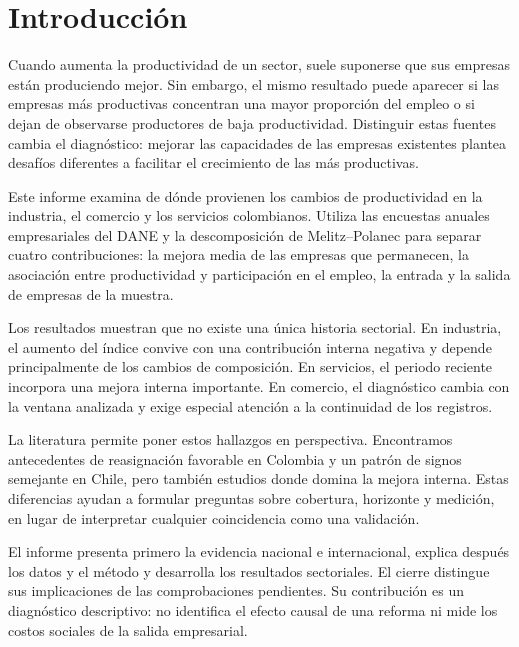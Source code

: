 \section{Introducción}
Cuando aumenta la productividad de un sector, suele suponerse que sus empresas están produciendo mejor. Sin embargo, el mismo resultado puede aparecer si las empresas más productivas concentran una mayor proporción del empleo o si dejan de observarse productores de baja productividad. Distinguir estas fuentes cambia el diagnóstico: mejorar las capacidades de las empresas existentes plantea desafíos diferentes a facilitar el crecimiento de las más productivas.

Este informe examina de dónde provienen los cambios de productividad en la industria, el comercio y los servicios colombianos. Utiliza las encuestas anuales empresariales del DANE y la descomposición de Melitz--Polanec para separar cuatro contribuciones: la mejora media de las empresas que permanecen, la asociación entre productividad y participación en el empleo, la entrada y la salida de empresas de la muestra.

Los resultados muestran que no existe una única historia sectorial. En industria, el aumento del índice convive con una contribución interna negativa y depende principalmente de los cambios de composición. En servicios, el periodo reciente incorpora una mejora interna importante. En comercio, el diagnóstico cambia con la ventana analizada y exige especial atención a la continuidad de los registros.

La literatura permite poner estos hallazgos en perspectiva. Encontramos antecedentes de reasignación favorable en Colombia y un patrón de signos semejante en Chile, pero también estudios donde domina la mejora interna. Estas diferencias ayudan a formular preguntas sobre cobertura, horizonte y medición, en lugar de interpretar cualquier coincidencia como una validación.

El informe presenta primero la evidencia nacional e internacional, explica después los datos y el método y desarrolla los resultados sectoriales. El cierre distingue sus implicaciones de las comprobaciones pendientes. Su contribución es un diagnóstico descriptivo: no identifica el efecto causal de una reforma ni mide los costos sociales de la salida empresarial.
\clearpage
